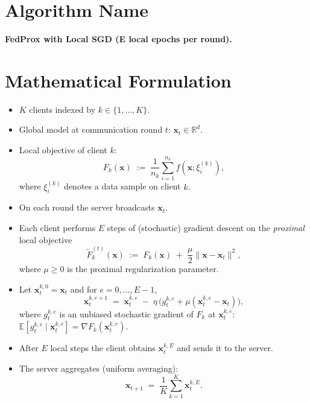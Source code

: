 \documentclass{article}
\begin{document}
\section*{Algorithm Name}
\textbf{FedProx with Local SGD (E local epochs per round).}

\section*{Mathematical Formulation}
\begin{itemize}
    \item $K$ clients indexed by $k\in\{1,\dots,K\}$.
    \item Global model at communication round $t$: $\mathbf{x}_t\in\mathbb{R}^d$.
    \item Local objective of client $k$:
    \[
        F_k(\mathbf{x})\;:=\;\frac{1}{n_k}\sum_{i=1}^{n_k} f(\mathbf{x};\xi_i^{(k)}),
    \]
    where $\xi_i^{(k)}$ denotes a data sample on client $k$.
    \item On each round the server broadcasts $\mathbf{x}_t$.
    \item Each client performs $E$ steps of (stochastic) gradient descent on the \emph{proximal} local objective
    \[
        \tilde F_k^{(t)}(\mathbf{x}) \;:=\; F_k(\mathbf{x}) \;+\; \frac{\mu}{2}\|\mathbf{x}-\mathbf{x}_t\|^2,
    \]
    where $\mu\ge 0$ is the proximal regularization parameter.
    \item Let $\mathbf{x}_{t}^{k,0}=\mathbf{x}_t$ and for $e=0,\dots,E-1$,
    \[
        \mathbf{x}_{t}^{k,e+1}
        \;=\;
        \mathbf{x}_{t}^{k,e}
        \;-\;
        \eta\,\bigl(g_{t}^{k,e}+\mu(\mathbf{x}_{t}^{k,e}-\mathbf{x}_t)\bigr),
    \tag{1}
    \]
    where $g_{t}^{k,e}$ is an unbiased stochastic gradient of $F_k$ at $\mathbf{x}_{t}^{k,e}$:
    $\mathbb{E}[g_{t}^{k,e}\mid\mathbf{x}_{t}^{k,e}]=\nabla F_k(\mathbf{x}_{t}^{k,e})$.
    \item After $E$ local steps the client obtains $\mathbf{x}_{t}^{k,E}$ and sends it to the server.
    \item The server aggregates (uniform averaging):
    \[
        \mathbf{x}_{t+1}\;=\;\frac{1}{K}\sum_{k=1}^{K}\mathbf{x}_{t}^{k,E}.
    \tag{2}
    \]
\end{itemize}
\end{document}
